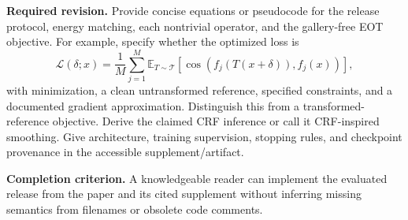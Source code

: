 \documentclass[11pt,a4paper]{article}
\newcommand{\action}{\par\textbf{Required revision.} }
\newcommand{\acceptance}{\par\textbf{Completion criterion.} }
\begin{document}
\action
Provide concise equations or pseudocode for the release protocol, energy matching, each nontrivial operator, and the gallery-free EOT objective. For example, specify whether the optimized loss is
\[
\mathcal L(\delta;x)=\frac{1}{M}\sum_{j=1}^M
\mathbb E_{T\sim\mathcal T}
\left[\cos\!\left(f_j(T(x+\delta)),f_j(x)\right)\right],
\]
with minimization, a clean untransformed reference, specified constraints, and a documented gradient approximation. Distinguish this from a transformed-reference objective. Derive the claimed CRF inference or call it CRF-inspired smoothing. Give architecture, training supervision, stopping rules, and checkpoint provenance in the accessible supplement/artifact.
\acceptance
A knowledgeable reader can implement the evaluated release from the paper and its cited supplement without inferring missing semantics from filenames or obsolete code comments.
\end{document}
